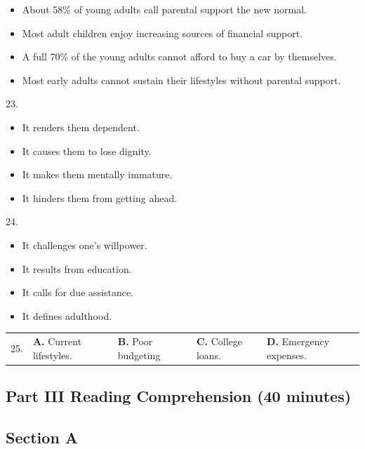 \documentclass[UTF8,11pt]{ctexart}
\begin{document}
\begin{itemize}[leftmargin=2em,itemsep=.2em,topsep=.4em]\item[A.] About 58\% of young adults call parental support the new normal.
\item[B.] Most adult children enjoy increasing sources of financial support.
\item[C.] A full 70\% of the young adults cannot afford to buy a car by themselves.
\item[D.] Most early adults cannot sustain their lifestyles without parental support.
\end{itemize}

23.


\begin{itemize}[leftmargin=2em,itemsep=.2em,topsep=.4em]\item[A.] It renders them dependent.
\item[B.] It causes them to lose dignity.
\item[C.] It makes them mentally immature.
\item[D.] It hinders them from getting ahead.
\end{itemize}

24.


\begin{itemize}[leftmargin=2em,itemsep=.2em,topsep=.4em]\item[A.] It challenges one’s willpower.
\item[B.] It results from education.
\item[C.] It calls for due assistance.
\item[D.] It defines adulthood.
\end{itemize}

\noindent\begin{tabularx}{\linewidth}{@{}lXXXX@{}}25. & \textbf{A.} Current lifestyles. & \textbf{B.} Poor budgeting & \textbf{C.} College loans. & \textbf{D.} Emergency expenses.\\\end{tabularx}\par

\subsection*{\textbf{Part III Reading Comprehension (40 minutes)}}


\subsection*{\textbf{Section A}}
\end{document}
